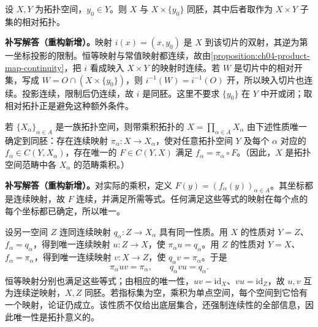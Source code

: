 \documentclass[../../main.tex]{subfiles}%
\begin{document}
\begin{exercise}\label{exercise:ch04-product-slice}
设 $X,Y$ 为拓扑空间，$y_0\in Y$。则 $X$ 与 $X\times\{y_0\}$ 同胚，其中后者取作为 $X\times Y$ 子集的相对拓扑。
\end{exercise}
\begin{solution}
\textbf{补写解答（重构新增）。}映射 $i(x)=(x,y_0)$ 是 $X$ 到该切片的双射，其逆为第一坐标投影的限制。恒等映射与常值映射都连续，故由\cref{proposition:ch04-product-map-continuity}，把 $i$ 看成映入 $X\times Y$ 的映射时连续。若 $W$ 是切片中的相对开集，写成 $W=O\cap(X\times\{y_0\})$，则 $i^{-1}(W)=i^{-1}(O)$ 开，所以映入切片也连续。投影连续，限制后仍连续，故 $i$ 是同胚。这里不要求 $\{y_0\}$ 在 $Y$ 中开或闭；取相对拓扑正是避免这种额外条件。
\end{solution}
\begin{exercise}\label{exercise:ch04-product-universal}
若 $\{X_\alpha\}_{\alpha\in A}$ 是一族拓扑空间，则带乘积拓扑的 $X=\prod_{\alpha\in A}X_\alpha$ 由下述性质唯一确定到同胚：存在连续映射 $\pi_\alpha:X\to X_\alpha$，使对任意拓扑空间 $Y$ 及每个 $\alpha$ 对应的 $f_\alpha\in C(Y,X_\alpha)$，存在唯一的 $F\in C(Y,X)$ 满足 $f_\alpha=\pi_\alpha\circ F$。（因此，$X$ 是拓扑空间范畴中各 $X_\alpha$ 的范畴乘积。）
\end{exercise}
\begin{solution}
\textbf{补写解答（重构新增）。}对实际的乘积，定义 $F(y)=(f_\alpha(y))_{\alpha\in A}$。其坐标都是连续映射，故 $F$ 连续，并满足所需等式。任何满足这些等式的映射在每个点的每个坐标都已确定，所以唯一。

设另一空间 $Z$ 连同连续映射 $q_\alpha:Z\to X_\alpha$ 具有同一性质。用 $X$ 的性质对 $Y=Z$、$f_\alpha=q_\alpha$，得到唯一连续映射 $u:Z\to X$，使 $\pi_\alpha u=q_\alpha$。用 $Z$ 的性质对 $Y=X$、$f_\alpha=\pi_\alpha$，得到唯一连续映射 $v:X\to Z$，使 $q_\alpha v=\pi_\alpha$。于是
\begin{align*}
\pi_\alpha uv=\pi_\alpha,\qquad q_\alpha vu=q_\alpha.
\end{align*}
恒等映射分别也满足这些等式；由相应的唯一性，$uv=\mathrm{id}_X$、$vu=\mathrm{id}_Z$，故 $u,v$ 互为连续逆映射，$X,Z$ 同胚。若指标集为空，乘积为单点空间，每个空间到它恰有一个映射，论证仍成立。该性质不仅给出底层集合，还强制连续性的全部信息，因此唯一性是拓扑意义的。
\end{solution}
\end{document}
